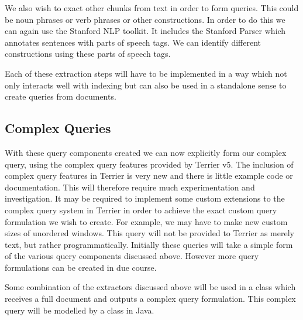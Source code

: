 \documentclass{mprop}
\begin{document}
We also wish to exact other chunks from text in order to form queries.
This could be noun phrases or verb phrases or other constructions.
In order to do this we can again use the Stanford NLP toolkit.
It includes the Stanford Parser which annotates sentences with parts of speech tags.
We can identify different constructions using these parts of speech tags.

Each of these extraction steps will have to be implemented in a way which not only interacts well with indexing but can also be used in a standalone sense to create queries from documents.


\subsection{Complex Queries}
With these query components created we can now explicitly form our complex query, using the complex query features provided by Terrier v5. 
The inclusion of complex query features in Terrier is very new and there is little example code or documentation.
This will therefore require much experimentation and investigation.
It may be required to implement some  custom extensions to the complex query system in Terrier in order to achieve the exact custom query formulation we wish to create.
For example, we may have to make new custom sizes of unordered windows. 
This query will not be provided to Terrier as merely text, but rather programmatically. 
Initially these queries will take a simple form of the various query components discussed above. 
However more query formulations can be created in due course.


Some combination of the extractors discussed above will be used in a class which receives a full document and outputs a complex query formulation.
This complex query will be modelled by a class in Java.

\end{document}
